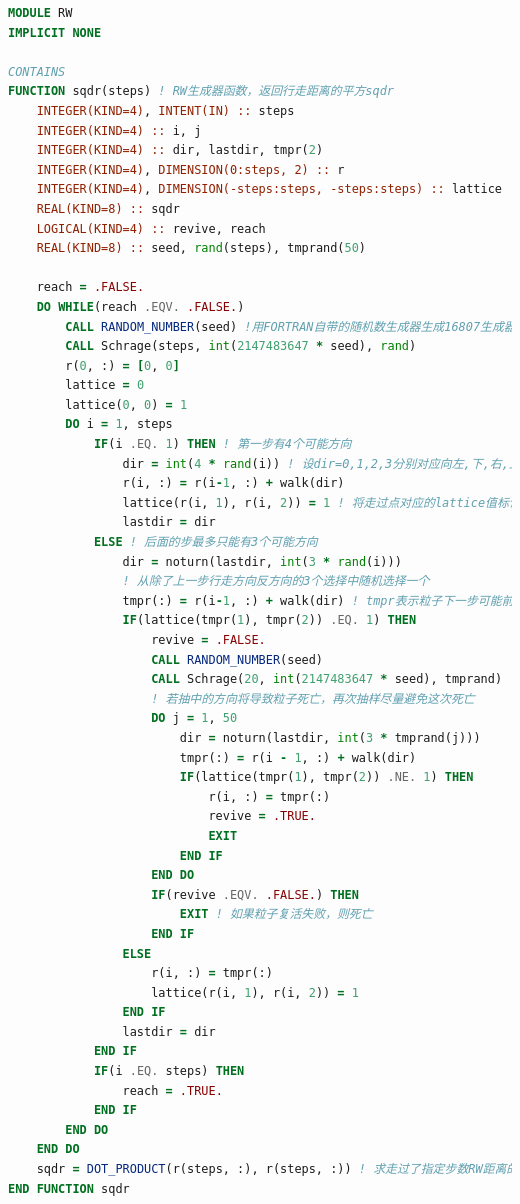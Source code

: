 \documentclass[12pt,a4paper,utf8]{ctexart}
\begin{document}
\begin{framed}
\begin{lstlisting}[language=Fortran]
MODULE RW
IMPLICIT NONE

CONTAINS
FUNCTION sqdr(steps) ! RW生成器函数，返回行走距离的平方sqdr
    INTEGER(KIND=4), INTENT(IN) :: steps
    INTEGER(KIND=4) :: i, j
    INTEGER(KIND=4) :: dir, lastdir, tmpr(2)
    INTEGER(KIND=4), DIMENSION(0:steps, 2) :: r
    INTEGER(KIND=4), DIMENSION(-steps:steps, -steps:steps) :: lattice
    REAL(KIND=8) :: sqdr
    LOGICAL(KIND=4) :: revive, reach
    REAL(KIND=8) :: seed, rand(steps), tmprand(50)

    reach = .FALSE.
    DO WHILE(reach .EQV. .FALSE.)
        CALL RANDOM_NUMBER(seed) !用FORTRAN自带的随机数生成器生成16807生成器的种子
        CALL Schrage(steps, int(2147483647 * seed), rand)
        r(0, :) = [0, 0]
        lattice = 0
        lattice(0, 0) = 1
        DO i = 1, steps
            IF(i .EQ. 1) THEN ! 第一步有4个可能方向
                dir = int(4 * rand(i)) ! 设dir=0,1,2,3分别对应向左,下,右,上
                r(i, :) = r(i-1, :) + walk(dir)
                lattice(r(i, 1), r(i, 2)) = 1 ! 将走过点对应的lattice值标记为1
                lastdir = dir
            ELSE ! 后面的步最多只能有3个可能方向
                dir = noturn(lastdir, int(3 * rand(i)))
                ! 从除了上一步行走方向反方向的3个选择中随机选择一个
                tmpr(:) = r(i-1, :) + walk(dir) ! tmpr表示粒子下一步可能前往的位置
                IF(lattice(tmpr(1), tmpr(2)) .EQ. 1) THEN
                    revive = .FALSE.
                    CALL RANDOM_NUMBER(seed) 
                    CALL Schrage(20, int(2147483647 * seed), tmprand)
                    ! 若抽中的方向将导致粒子死亡，再次抽样尽量避免这次死亡
                    DO j = 1, 50
                        dir = noturn(lastdir, int(3 * tmprand(j)))
                        tmpr(:) = r(i - 1, :) + walk(dir)
                        IF(lattice(tmpr(1), tmpr(2)) .NE. 1) THEN
                            r(i, :) = tmpr(:)
                            revive = .TRUE.
                            EXIT
                        END IF
                    END DO
                    IF(revive .EQV. .FALSE.) THEN
                        EXIT ! 如果粒子复活失败，则死亡
                    END IF
                ELSE
                    r(i, :) = tmpr(:)
                    lattice(r(i, 1), r(i, 2)) = 1
                END IF
                lastdir = dir
            END IF
            IF(i .EQ. steps) THEN
                reach = .TRUE.
            END IF
        END DO
    END DO
    sqdr = DOT_PRODUCT(r(steps, :), r(steps, :)) ! 求走过了指定步数RW距离的平方
END FUNCTION sqdr


\end{lstlisting}
\end{framed}
\end{document}
